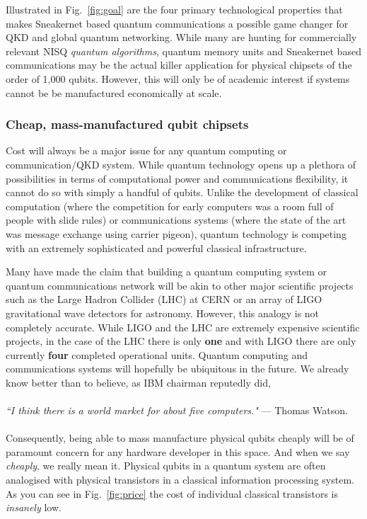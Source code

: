 \documentclass[twocolumn, aps, rmp, amsmath, amssymb, nofootinbib, superscriptaddress, longbibliography, floatfix, table-of-contents, eqsecnum]{revtex4-2}
\newcommand{\famousquote}[2]{\noindent\textit{``#1"} --- #2.\index{Quotes}\index{#2}}
\begin{document}
Illustrated in Fig.~\ref{fig:goal} are the four primary technological properties that makes Sneakernet based quantum communications a possible game changer for QKD and global quantum networking. While many are hunting for commercially relevant NISQ \textit{quantum algorithms}, quantum memory units and Sneakernet based communications may be the actual killer application for physical chipsets of the order of 1,000 qubits. However, this will only be of academic interest if systems cannot be be manufactured economically at scale.

\subsubsection{Cheap, mass-manufactured qubit chipsets}

Cost will always be a major issue for any quantum computing or communication/QKD system. While quantum technology opens up a plethora of possibilities in terms of computational power and communications flexibility, it cannot do so with simply a handful of qubits. Unlike the development of classical computation (where the competition for early computers was a room full of people with slide rules) or communications systems (where the state of the art was message exchange using carrier pigeon), quantum technology is competing with an extremely sophisticated and powerful classical infrastructure. 

Many have made the claim that building a quantum computing system or quantum communications network will be akin to other major scientific projects such as the Large Hadron Collider (LHC) at CERN or an array of LIGO gravitational wave detectors for astronomy. However, this analogy is not completely accurate. While LIGO and the LHC are extremely expensive scientific projects, in the case of the LHC there is only \textbf{one} and with LIGO there are only currently \textbf{four} completed operational units. Quantum computing and communications systems will hopefully be ubiquitous in the future. We already know better than to believe, as IBM chairman reputedly did,
\\
\\
\famousquote{I think there is a world market for about five computers.}{Thomas Watson}
\\
\\
Consequently, being able to mass manufacture physical qubits cheaply will be of paramount concern for any hardware developer in this space. And when we say \textit{cheaply}, we really mean it. Physical qubits in a quantum system are often analogised with physical transistors in a classical information processing system. As you can see in Fig.~\ref{fig:price} the cost of individual classical transistors is \textit{insanely} low. 
 
\end{document}
